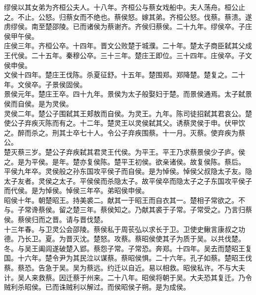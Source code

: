 \documentclass{zhvt-classic}
\begin{document}
\hspace*{2em}缪侯以其女弟为齐桓公夫人。十八年。齐桓公与蔡女戏船中。夫人荡舟。桓公止之。不止。公怒。归蔡女而不绝也。蔡侯怒。嫁其弟。齐桓公怒。伐蔡。蔡溃。遂虏缪侯。南至楚邵陵。已而诸侯为蔡谢齐。齐侯归蔡侯。二十九年。缪侯卒。子庄侯甲午侯。\\
\hspace*{2em}庄侯三年。齐桓公卒。十四年。晋文公败楚于城濮。二十年。楚太子商臣弑其父成王代侯。二十五年。秦穆公卒。三十三年。楚庄王即位。三十四年。庄侯卒。子文侯申侯。\\
\hspace*{2em}文侯十四年。楚庄王伐陈。杀夏征舒。十五年。楚围郑。郑降楚。楚复之。二十年。文侯卒。子景侯固侯。\\
\hspace*{2em}景侯元年。楚庄王卒。四十九年。景侯为太子般娶妇于楚。而景侯通焉。太子弑景侯而自侯。是为灵侯。\\
\hspace*{2em}灵侯二年。楚公子围弑其王郏敖而自侯。为灵王。九年。陈司徒招弑其君哀公。楚使公子弃疾灭陈而有之。十二年。楚灵王以灵侯弑其父。诱蔡灵侯于申。伏甲饮之。醉而杀之。刑其士卒七十人。令公子弃疾围蔡。十一月。灭蔡。使弃疾为蔡公。\\
\hspace*{2em}楚灭蔡三岁。楚公子弃疾弑其君灵王代侯。为平王。平王乃求蔡景侯少子庐。侯之。是为平侯。是年。楚亦复侯陈。楚平王初侯。欲亲诸侯。故复侯陈。蔡后。\\
\hspace*{2em}平侯九年卒。灵侯般之孙东国攻平侯子而自侯。是为悼侯。悼侯父叔隐太子友。隐太子友者。灵侯之太子。平侯侯而杀隐太子。故平侯卒而隐太子之子东国攻平侯子而代侯。是为悼侯。悼侯三年卒。弟昭侯申侯。\\
\hspace*{2em}昭侯十年。朝楚昭王。持美裘二。献其一于昭王而自衣其一。楚相子常欲之。不与。子常谗蔡侯。留之楚三年。蔡侯知之。乃献其裘于子常。子常受之。乃言归蔡侯。蔡侯归而之晋。请与晋伐楚。\\
\hspace*{2em}十三年春。与卫灵公会邵陵。蔡侯私于周苌弘以求长于卫。卫使史鳅言康叔之功德。乃长卫。夏。为晋灭沈。楚怒。攻蔡。蔡昭侯使其子为质于吴。以共伐楚。冬。与吴王阖闾遂破楚入郢。蔡怨子常。子常恐。奔郑。十四年。吴去而楚昭王复国。十六年。楚令尹为其民泣以谋蔡。蔡昭侯惧。二十六年。孔子如蔡。楚昭王伐蔡。蔡恐。告急于吴。吴为蔡远。约迁以自近。易以相救。昭侯私许。不与大夫计。吴人来救蔡。因迁蔡于州来。二十八年。昭侯将朝于吴。大夫恐其复迁。乃令贼利杀昭侯。已而诛贼利以解过。而侯昭侯子朔。是为成侯。\\
\end{document}
